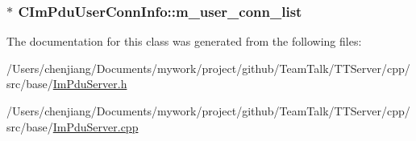 \subsubsection[{m\+\_\+user\+\_\+conn\+\_\+list}]{$\ast$ C\+Im\+Pdu\+User\+Conn\+Info\+::m\+\_\+user\+\_\+conn\+\_\+list\hspace{0.3cm}{\ttfamily [private]}}\label{class_c_im_pdu_user_conn_info_af1bc829fec1e67ec4d9d6c45ac407e3f}


The documentation for this class was generated from the following files\+:\begin{DoxyCompactItemize}
\item 
/\+Users/chenjiang/\+Documents/mywork/project/github/\+Team\+Talk/\+T\+T\+Server/cpp/src/base/\hyperlink{_im_pdu_server_8h}{Im\+Pdu\+Server.\+h}\item 
/\+Users/chenjiang/\+Documents/mywork/project/github/\+Team\+Talk/\+T\+T\+Server/cpp/src/base/\hyperlink{_im_pdu_server_8cpp}{Im\+Pdu\+Server.\+cpp}\end{DoxyCompactItemize}
